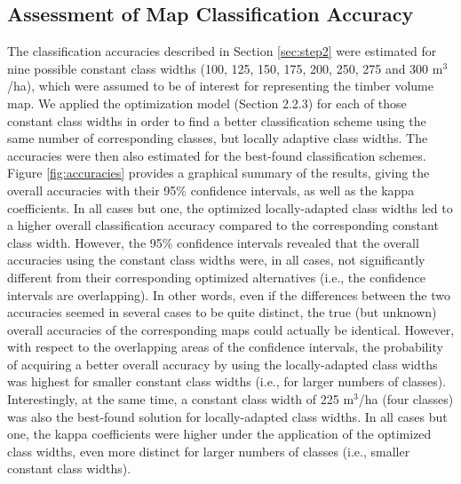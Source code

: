 \subsection{Assessment of Map Classification Accuracy}
\label{sec:mapacc}

The classification accuracies described in Section \ref{sec:step2} were estimated for nine possible constant class widths (100, 125, 150, 175, 200, 250, 275 and 300 m$^3$/ha), which were assumed to be of interest for representing the timber volume map. We applied the optimization model (Section 2.2.3) for each of those constant class widths in order to find a better classification scheme using the same number of corresponding classes, but locally adaptive class widths. The accuracies were then also estimated for the best-found classification schemes. Figure \ref{fig:accuracies} provides a graphical summary of the results, giving the overall accuracies with their 95\% confidence intervals, as well as the kappa coefficients. In all cases but one, the optimized locally-adapted class widths led to a higher overall classification accuracy compared to the corresponding constant class width. However, the 95\% confidence intervals revealed that the overall accuracies using the constant class widths were, in all cases, not significantly different from their corresponding optimized alternatives (i.e., the confidence intervals are overlapping). In other words, even if the differences between the two accuracies seemed in several cases to be quite distinct, the true (but unknown) overall accuracies of the corresponding maps could actually be identical. However, with respect to the overlapping areas of the confidence intervals, the probability of acquiring a better overall accuracy by using the locally-adapted class widths was highest for smaller constant class widths (i.e., for larger numbers of classes). Interestingly, at the same time, a constant class width of 225 m$^3$/ha (four classes) was also the best-found solution for locally-adapted class widths. In all cases but one, the kappa coefficients were higher under the application of the optimized class widths, even more distinct for larger numbers of classes (i.e., smaller constant class widths).

